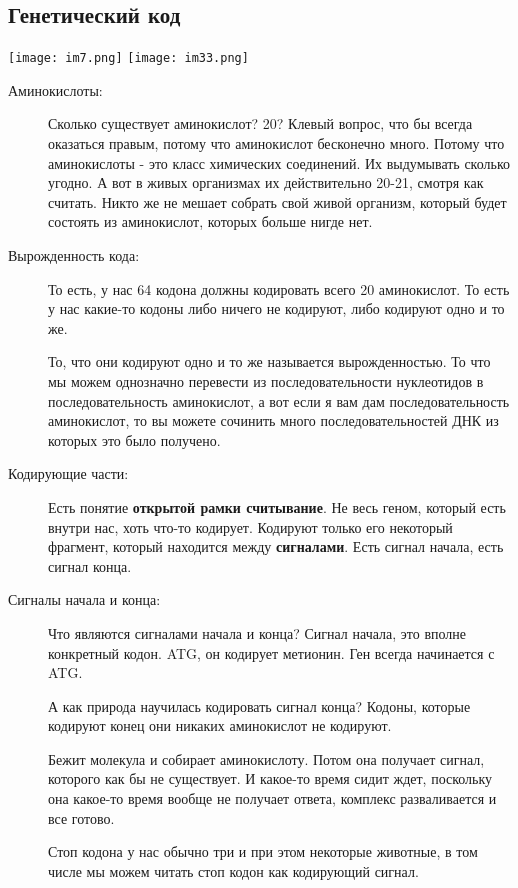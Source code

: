 \subsection{Генетический код}
\texttt{[image: im7.png]}
\texttt{[image: im33.png]}
\begin{description}
\item[Аминокислоты:]
Сколько существует аминокислот?
20?
Клевый вопрос, что бы всегда оказаться правым, потому что
аминокислот бесконечно много. Потому что аминокислоты - это
класс химических соединений. Их выдумывать сколько угодно.
А вот в живых организмах их действительно 20-21, смотря как 
считать. Никто же не мешает собрать свой живой организм, 
который будет состоять из аминокислот, которых больше нигде нет. 

\item[Вырожденность кода:]
То есть, у нас 64 кодона должны кодировать всего 20 аминокислот. 
То есть у нас какие-то кодоны либо ничего не кодируют, 
либо кодируют одно и то же. 

То, что они кодируют одно и то же называется вырожденностью. 
То что мы можем однозначно перевести из последовательности 
нуклеотидов в последовательность аминокислот, 
а вот если я вам дам последовательность аминокислот, 
то вы можете сочинить много 
последовательностей ДНК из которых это было получено. 

\item[Кодирующие части:]
Есть понятие \textbf{открытой рамки считывание}. Не весь 
геном, который есть внутри нас,  хоть что-то кодирует. 
Кодируют только его некоторый фрагмент, который 
находится между \textbf{сигналами}. Есть сигнал начала, 
есть сигнал конца. 

\item[Сигналы начала и конца:]
Что являются сигналами начала и конца? 
Сигнал начала, это вполне конкретный кодон. ATG, он 
кодирует метионин. Ген всегда начинается с 
ATG. 

А как природа научилась кодировать сигнал конца? Кодоны, 
которые кодируют конец они никаких 
аминокислот не кодируют. 

Бежит молекула и собирает аминокислоту. Потом она получает 
сигнал, которого как бы не существует. И какое-то время сидит ждет, 
поскольку она какое-то время вообще не получает ответа, 
комплекс разваливается и все готово. 

Стоп кодона у нас обычно три и при этом некоторые животные, 
в том числе мы можем читать стоп кодон как кодирующий сигнал. 


\end{description}
